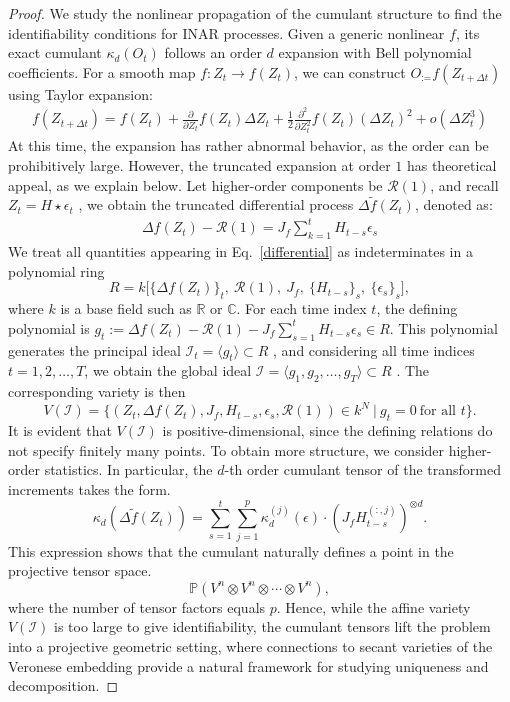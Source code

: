 \documentclass[10pt]{article}
\numberwithin{figure}{section}
\begin{document}
\begin{proof}
     We study the nonlinear propagation of the cumulant structure to find the identifiability conditions for INAR processes. Given a generic nonlinear $f$, its exact cumulant $\kappa_d(O_t)$ follows an order $d$ expansion with Bell polynomial coefficients.
     For a smooth map $f: Z_t\rightarrow f(Z_t)$,  we can construct $O_:= f(Z_{t+\Delta t})$ using Taylor expansion:
    \begin{align*}
f(Z_{t+\Delta t}) = f(Z_t) + \frac{\partial}{\partial Z_t}f(Z_t)\Delta Z_t+ \frac{1}{2}\frac{\partial^2}{\partial Z_t^2}f(Z_t)(\Delta Z_t)^2 + o(\Delta Z_t^3)
    \end{align*}
    At this time, the expansion has rather abnormal behavior, as the order can be prohibitively large. However, the truncated expansion at order $1$ has theoretical appeal, as we explain below. Let higher-order components be $\mathcal{R}(1)$, and recall $Z_t = H\star \epsilon_t$ , we obtain the truncated differential process $\Delta \tilde{ f}(Z_t)$, denoted as:
    \begin{align}\label{differential}
        \Delta f(Z_t) - \mathcal{R}(1) = J_f\sum\limits_{k=1}^{t}H_{t-s}\epsilon_s
    \end{align}
    We treat all quantities appearing in Eq.~\eqref{differential} as indeterminates in a polynomial ring \[
R = k\big[\{\Delta f(Z_t)\}_{t}, \ \mathcal{R}(1), \ J_f, \ \{H_{t-s}\}_{s}, \ \{\epsilon_s\}_{s}\big],
\] where \(k\) is a base field such as \(\mathbb{R}\) or \(\mathbb{C}\). For each time index \(t\), the defining polynomial is \(g_t := \Delta f(Z_t) - \mathcal{R}(1) - J_f \sum_{s=1}^t H_{t-s}\epsilon_s \in R.\) This polynomial generates the principal ideal \(\mathcal{I}_t = \langle g_t \rangle \subset R\) , and considering all time indices \(t=1,2,\dots,T\), we obtain the global ideal \(\mathcal{I} = \langle g_1, g_2, \dots, g_T \rangle \subset R\) . The corresponding variety is then
\[
V(\mathcal{I}) = \Big\{ (Z_t, \Delta f(Z_t), J_f, H_{t-s}, \epsilon_s, \mathcal{R}(1)) \in k^N \ \Big|\ g_t = 0 \ \text{for all } t \Big\}.
\]
It is evident that $V(\mathcal{I})$ is positive-dimensional, since the defining relations do not specify finitely many points. To obtain more structure, we consider higher-order statistics. In particular, the $d$-th order cumulant tensor of the transformed increments takes the form.
\[
\kappa_d \!\left( \Delta \tilde{f}(Z_t) \right) 
= \sum_{s=1}^{t} \sum_{j=1}^{p} \kappa_d^{(j)}(\epsilon) \cdot \left(J_f H_{t-s}^{(:,j)}\right)^{\otimes d}.
\]
This expression shows that the cumulant naturally defines a point in the projective tensor space.
\[
\mathbb{P}\!\left( V^n \otimes V^n \otimes \cdots \otimes V^n \right),
\]
where the number of tensor factors equals $p$. Hence, while the affine variety $V(\mathcal{I})$ is too large to give identifiability, the cumulant tensors lift the problem into a projective geometric setting, where connections to secant varieties of the Veronese embedding provide a natural framework for studying uniqueness and decomposition. 
\end{proof}
\end{document}
